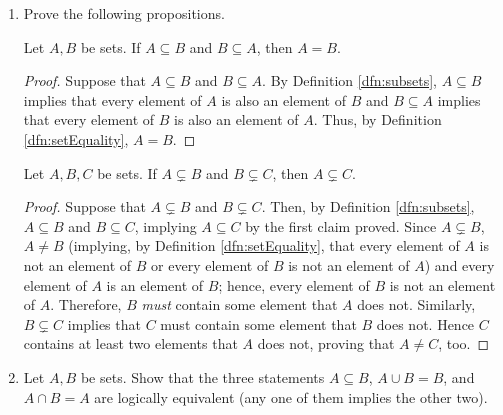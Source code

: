 \documentclass[../main.tex]{subfiles}
\begin{document}
\begin{enumerate}[ref={\thesection.\arabic*}]
\begin{lem}
\begin{proof}
            Lastly, we show that $A=A\cup A$. By Definition \ref{dfn:setEquality}, it will suffice to show that every element $x$ of $A$ is an element of $A\cup A$ and vice versa. By Axiom \ref{axm:pairwiseUnion}, every element $x$ of $A$ is an element of $A\cup A$. Now let $x\in A\cup A$. Then by Axiom \ref{axm:pairwiseUnion}, $x\in A$ or $x\in A$, implying $x\in A$. We have, at last, by the transitive property that $A=A\cup\emptyset=\emptyset\cup A=A\cup A$.
        \end{proof}
    \end{lem}
    \item \label{exr:3.1.4}Prove the following propositions.
    \begin{lem}
        Let $A,B$ be sets. If $A\subseteq B$ and $B\subseteq A$, then $A=B$.
        \begin{proof}
            Suppose that $A\subseteq B$ and $B\subseteq A$. By Definition \ref{dfn:subsets}, $A\subseteq B$ implies that every element of $A$ is also an element of $B$ and $B\subseteq A$ implies that every element of $B$ is also an element of $A$. Thus, by Definition \ref{dfn:setEquality}, $A=B$.
        \end{proof}
    \end{lem}
    \begin{lem}
        Let $A,B,C$ be sets. If $A\subsetneq B$ and $B\subsetneq C$, then $A\subsetneq C$.
        \begin{proof}
            Suppose that $A\subsetneq B$ and $B\subsetneq C$. Then, by Definition \ref{dfn:subsets}, $A\subseteq B$ and $B\subseteq C$, implying $A\subseteq C$ by the first claim proved. Since $A\subsetneq B$, $A\neq B$ (implying, by Definition \ref{dfn:setEquality}, that every element of $A$ is not an element of $B$ or every element of $B$ is not an element of $A$) and every element of $A$ is an element of $B$; hence, every element of $B$ is not an element of $A$. Therefore, $B$ \emph{must} contain some element that $A$ does not. Similarly, $B\subsetneq C$ implies that $C$ must contain some element that $B$ does not. Hence $C$ contains at least two elements that $A$ does not, proving that $A\neq C$, too.
        \end{proof}
    \end{lem}
    \item \label{exr:3.1.5}Let $A,B$ be sets. Show that the three statements $A\subseteq B$, $A\cup B=B$, and $A\cap B=A$ are logically equivalent (any one of them implies the other two).

\end{enumerate}
\end{document}
